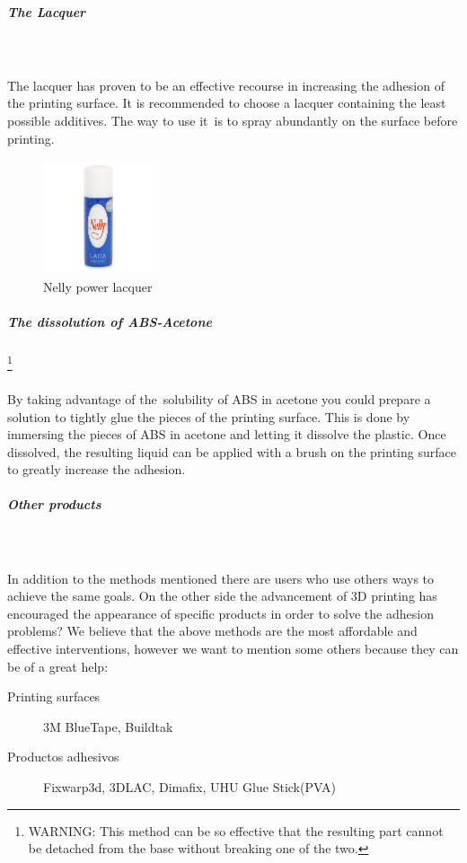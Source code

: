 \documentclass[11pt,a4paper]{article}
\begin{document}
				\subparagraph{The Lacquer}\mbox{}\\\\
The lacquer has proven to be an effective recourse in increasing the adhesion of the printing surface. It is recommended to choose a lacquer containing the least possible additives. The way to use it is to spray abundantly on the surface before printing.
\begin{figure}[H]
\centering
\includegraphics[width=0.3\textwidth,cfbox=azul_marcos 4pt 0pt]{FOTOS/LACA}
\caption*{Nelly power lacquer}
\end{figure}
				\subparagraph{The dissolution of ABS-Acetone}\footnote{WARNING: This method can be so effective that the resulting part cannot be detached from the base without breaking one of the two.} \mbox{}\\\\
By taking advantage of the solubility of ABS in acetone you could prepare a solution to tightly glue the pieces of the printing surface. This is done by immersing the pieces of ABS in acetone and letting it dissolve the plastic. Once dissolved, the resulting liquid can be applied with a brush on the printing surface to greatly increase the adhesion.
				\subparagraph{Other products}\mbox{}\\\\
In addition to the methods mentioned there are users who use others ways to achieve the same goals. On the other side the advancement of 3D printing has encouraged the appearance of specific products in order to solve the adhesion problems? We believe that the above methods are the most affordable and effective interventions, however we want to mention some others because they can be of a great help:
\begin{description}
\item[Printing surfaces] 3M BlueTape, Buildtak
\item[Productos adhesivos] Fixwarp3d, 3DLAC, Dimafix, UHU Glue Stick(PVA)
\end{description}
\end{document}
